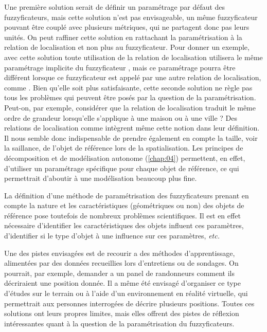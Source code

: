 Une première solution serait de définir un paramétrage par défaut des
fuzzyficateurs, mais cette solution n'est pas envisageable, un même
fuzzyficateur pouvant être couplé avec plusieurs métriques, qui ne
partagent donc pas leurs unités. On peut raffiner cette solution en
rattachant la paramétrisation à la relation de localisation et non
plus au fuzzyficateur. Pour donner un exemple, avec cette solution
toute utilisation de la relation de localisation
 utilisera le même paramétrage implicite du
fuzzyficateur , mais ce paramétrage pourra
être différent lorsque ce fuzzyficateur est appelé par une autre
relation de localisation, comme . Bien
qu'elle soit plus satisfaisante, cette seconde solution ne règle pas
tous les problèmes qui peuvent être posés par la question de la
paramétrisation. Peut-on, par exemple, considérer que la relation de
localisation  traduit le même ordre de grandeur
lorsqu'elle s'applique à une maison ou à une ville ? Des relations de
localisation comme  intègrent même cette
notion dans leur définition. Il nous semble donc indispensable de
prendre également en compte la taille, voir la saillance, de l'objet
de référence lors de la spatialisation. Les principes de décomposition
et de modélisation autonome (\autoref{chap:04}) permettent, en effet,
d'utiliser un paramétrage spécifique pour chaque objet de référence,
ce qui permettrait d'aboutir à une modélisation beaucoup plus fine.

La définition d'une méthode de paramétrisation des fuzzyficateurs
prenant en compte la nature et les caractéristiques (géométriques ou
non) des objets de référence pose toutefois de nombreux problèmes
scientifiques. Il est en effet nécessaire d'identifier les
caractéristiques des objets influent ces paramètres, d'identifier si
le type d'objet à une influence sur ces paramètres, \emph{etc.}

Une des pistes envisagées est de recourir a des méthodes
d'apprentissage, alimentées par des données recueillies lors
d'entretiens ou de sondages. On pourrait, par exemple, demander a un
panel de randonneurs comment ils décriraient une position donnée. Il a
même été envisagé d'organiser ce type d'études sur le terrain ou à
l'aide d'un environnement en réalité virtuelle, qui permettrait aux
personnes interrogées de décrire plusieurs positions. Toutes ces
solutions ont leurs propres limites, mais elles offrent des pistes de
réflexion intéressantes quant à la question de la paramétrisation du
fuzzyficateurs.

